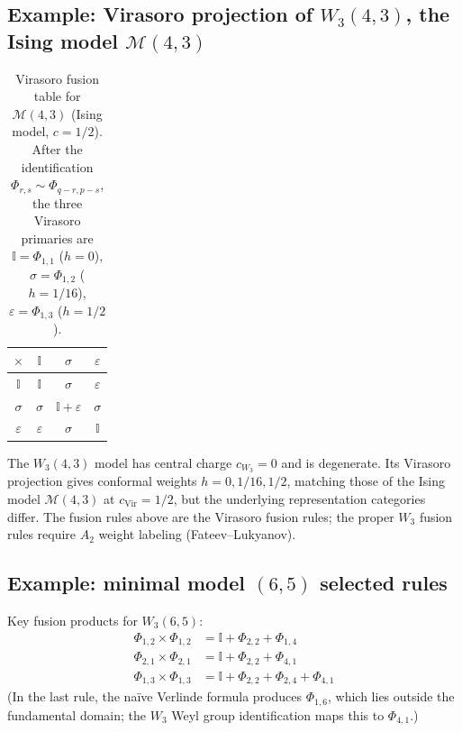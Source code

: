 \subsection{\texorpdfstring{Example: Virasoro projection of $W_3(4,3)$, the Ising model $\mathcal{M}(4,3)$}{Example: Virasoro projection of W3(4,3)}}

\begin{table}[ht]
\centering
\caption{Virasoro fusion table for $\mathcal{M}(4,3)$ (Ising model, $c = 1/2$). After the identification $\Phi_{r,s} \sim \Phi_{q-r,p-s}$, the three Virasoro primaries are $\mathbb{I} = \Phi_{1,1}$ ($h=0$), $\sigma = \Phi_{1,2}$ ($h=1/16$), $\varepsilon = \Phi_{1,3}$ ($h=1/2$).}
\begin{tabular}{|c||c|c|c|}
\hline
$\times$ & $\mathbb{I}$ & $\sigma$ & $\varepsilon$ \\
\hline\hline
$\mathbb{I}$ & $\mathbb{I}$ & $\sigma$ & $\varepsilon$ \\
\hline
$\sigma$ & $\sigma$ & $\mathbb{I} + \varepsilon$ & $\sigma$ \\
\hline
$\varepsilon$ & $\varepsilon$ & $\sigma$ & $\mathbb{I}$ \\
\hline
\end{tabular}
\end{table}

\begin{remark}
The $W_3(4,3)$ model has central charge $c_{W_3} = 0$ and is degenerate. Its Virasoro projection gives conformal weights $h = 0, 1/16, 1/2$, matching those of the Ising model $\mathcal{M}(4,3)$ at $c_{\mathrm{Vir}} = 1/2$, but the underlying representation categories differ. The fusion rules above are the Virasoro fusion rules; the proper $W_3$ fusion rules require $A_2$ weight labeling (Fateev--Lukyanov).
\end{remark}

\subsection{\texorpdfstring{Example: minimal model $(6,5)$ selected rules}{Example: minimal model (6,5) selected rules}}

Key fusion products for $W_3(6,5)$:
\begin{align}
\Phi_{1,2} \times \Phi_{1,2} &= \mathbb{I} + \Phi_{2,2} + \Phi_{1,4} \\
\Phi_{2,1} \times \Phi_{2,1} &= \mathbb{I} + \Phi_{2,2} + \Phi_{4,1} \\
\Phi_{1,3} \times \Phi_{1,3} &= \mathbb{I} + \Phi_{2,2} + \Phi_{2,4} + \Phi_{4,1}
\end{align}
(In the last rule, the na\"ive Verlinde formula produces $\Phi_{1,6}$, which lies outside the fundamental domain; the $W_3$ Weyl group identification maps this to $\Phi_{4,1}$.)

